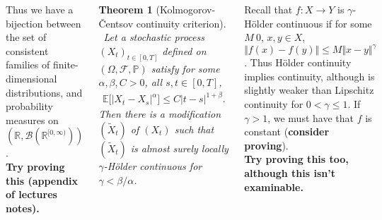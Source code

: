 \documentclass{tikzposter} %
\newcommand\rightopen[2]{\ensuremath{[#1,#2)}}
\newtheorem{theorem}{Theorem}
\newtheorem{definition}{Definition}
\begin{document}
\begin{columns}
{{      Thus we have a bijection between the set of consistent families of finite-dimensional distributions, and probability measures on $(\mathbb{R},\mathcal{B}(\mathbb{R}^{\rightopen{0}{\infty}}))$. \\

      \textbf{Try proving this (appendix of lectures notes).} \\

      \begin{theorem}[Kolmogorov-\v{C}entsov continuity criterion]
      \ Let a stochastic process $(X_{t})_{t \in [0,T]}$ defined on $(\Omega, \mathcal{F}, \mathbb{P})$ satisfy for some $\alpha, \beta, C > 0$, all $s, t \in [0,T]$,
      \begin{align*}
        \mathbb{E}\big[|X_{t}-X_{s}|^{\alpha}\big] \le C|t-s|^{1+\beta}.
      \end{align*}
      Then there is a modification $(\widetilde{X}_{t})$ of $(X_{t})$ such that $(\widetilde{X}_{t})$ is almost surely locally $\gamma$-H\"older continuous for $\gamma < \beta/\alpha$.
      \end{theorem}
      \hphantom{}

      Recall that $f : X \to Y$ is $\gamma$-H\"older continuous if for some $M \> 0$, $x,y \in X$, $\Vert f(x)-f(y) \Vert \le M\Vert x - y \Vert^{\gamma}$. Thus H\"older continuity implies continuity, although is slightly weaker than Lipschitz continuity for $0 < \gamma \le 1$. If $\gamma > 1$, we must have that $f$ is constant (\textbf{consider proving}). \\

      \textbf{Try proving this too, although this isn't examinable.}
    }
  }
\end{columns}
\end{document}
